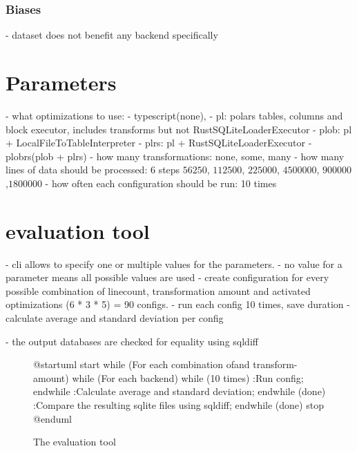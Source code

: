 \subsubsection{Biases}
- dataset does not benefit any backend specifically

\section{Parameters}
\label{section:parameters}
- what optimizations to use:
- typescript(none),
- pl: polars tables, columns and block executor, includes transforms but not RustSQLiteLoaderExecutor
- plob: pl + LocalFileToTableInterpreter
- plrs: pl + RustSQLiteLoaderExecutor
- plobrs(plob + plrs)
- how many transformations: none, some, many
- how many lines of data should be processed: $6$ steps $56250$, $112500$, $225000$, $4500000$, $900000$ ,$1800000$
- how often each configuration should be run: 10 times


\section{evaluation tool}
- cli allows to specify one or multiple values for the parameters.
- no value for a parameter means all possible values are used
- create configuration for every possible combination of linecount, transformation amount and activated optimizations (6 * 3 * 5) = 90 configs.
- run each config 10 times, save duration
- calculate average and standard deviation per config

- the output databases are checked for equality using sqldiff

\begin{figure}
	\begin{plantuml}
		@startuml
		start
		while (For each combination of\nlinecount and transform-amount)
		while (For each backend)
		while (10 times)
		:Run config;
		endwhile
		:Calculate average and
		standard deviation;
		endwhile (done)
		:Compare the resulting sqlite
		files using sqldiff;
		endwhile (done)
		stop
		@enduml
	\end{plantuml}
	\caption{The evaluation tool}\label{fig:uml:evalation-tool}
\end{figure}

